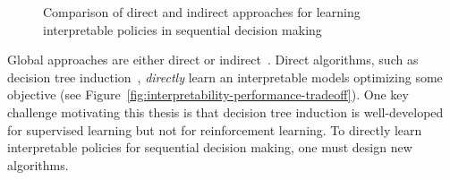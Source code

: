 \begin{figure}[htbp]
    \caption{Comparison of direct and indirect approaches for learning interpretable policies in sequential decision making}
    \label{fig:direct-vs-indirect-methods}
\end{figure}

Global approaches are either direct or indirect~\cite{milani-survey}. 
Direct algorithms, such as decision tree induction~\cite{breiman1984classification}, \textit{directly} learn an interpretable models optimizing some objective (see Figure~\ref{fig:interpretability-performance-tradeoff}).
One key challenge motivating this thesis is that decision tree induction is well-developed for supervised learning but not for reinforcement learning.
To directly learn interpretable policies for sequential decision making, one must design new algorithms. 

